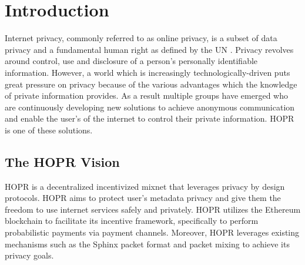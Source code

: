 \begin{abstract}

\end{abstract}

\section{Introduction}
\label{sec:introduction}

Internet privacy, commonly referred to as online privacy, is a subset of
data privacy and a fundamental human right as defined by the UN \cite{un2018}.
Privacy revolves around control, use and disclosure of a person’s
personally identifiable information. However, a world which is increasingly
technologically-driven puts great pressure on privacy because of the various
advantages which the knowledge of private information provides. As a result
multiple groups have emerged who are continuously developing new solutions to
achieve anonymous communication and enable the user's of the internet to control
their private information. HOPR is one of these solutions.

\subsection{The HOPR Vision}
\label{sec:vision}

HOPR is a decentralized incentivized mixnet that leverages privacy by design
protocols. HOPR aims to protect user's metadata privacy and give them the
freedom to use internet services safely and privately. HOPR utilizes the
Ethereum blockchain \cite{ethereum} to facilitate its incentive framework,
specifically to perform probabilistic payments via payment channels. Moreover,
HOPR leverages existing mechanisms such as the Sphinx packet format
\cite{sphinxpaper} and packet mixing to achieve its privacy goals.


